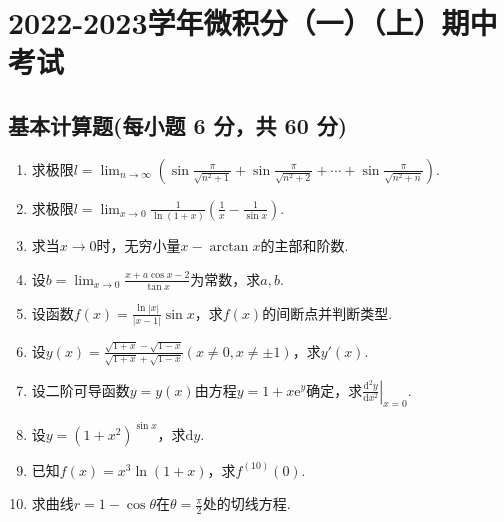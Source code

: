 \documentclass[../main.tex]{subfiles}
\begin{document}
\chapter{2022-2023学年微积分（一）（上）期中考试}

\section{基本计算题(每小题 6 分，共 60 分)}
\begin{enumerate}
    \item 求极限$l=\lim_{n\to\infty}\left(\sin\frac{\pi}{\sqrt{n^{2}+1}}+\sin\frac{\pi}{\sqrt{n^{2}+2}}
              +\cdots+\sin\frac{\pi}{\sqrt{n^{2}+n}}\right)$.
          \vspace{11em}

    \item 求极限$l=\lim_{x\to0}\frac{1}{\ln(1+x)}\left(\frac{1}{x}-\frac{1}{\sin
                  x}\right)$.
          \vspace{11em}

    \item 求当$x\to 0$时，无穷小量$x-\arctan x$的主部和阶数.
          \vspace{11em}

    \item 设$b=\lim_{x\to0}\frac{x+a\cos x-2}{\tan x}$为常数，求$a,b$.
          \vspace{11em}

    \item 设函数$f(x)=\frac{\ln |x|}{|x-1|}\sin x$，求$f(x)$的间断点并判断类型.
          \vspace{9em}

    \item 设$y(x)=\frac{\sqrt{1+x}-\sqrt{1-x}}{\sqrt{1+x}+\sqrt{1-x}}(x\neq0,x\neq
              \pm1)$，求$y'(x)$.
          \vspace{10em}

    \item 设二阶可导函数$y=y(x)$由方程$y=1+x\mathrm{e}^{y}$确定，求$\left.\frac{\mathrm{d}^{2}
                  y}{\mathrm{d}x^{2}}\right|_{x=0}$.
          \vspace{10em}

    \item 设$y=(1+x^{2})^{\sin x}$，求$\mathrm{d}y$.
          \vspace{10em}

    \item 已知$f(x)=x^{3}\ln(1+x)$，求$f^{(10)}(0)$.
          \vspace{8em}

    \item 求曲线$r=1-\cos \theta$在$\theta=\frac{\pi}{2}$处的切线方程.
          \vspace{8em}
\end{enumerate}
\end{document}
